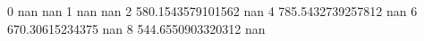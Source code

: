 0 nan nan
1 nan nan
2 580.1543579101562 nan
4 785.5432739257812 nan
6 670.30615234375 nan
8 544.6550903320312 nan
